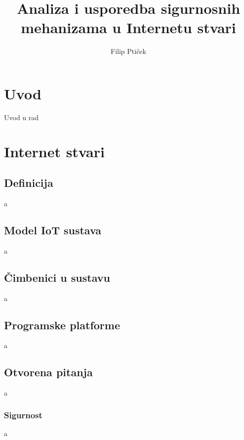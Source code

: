 \documentclass[times, utf8, diplomski]{fer}
\begin{document}

\title{Analiza i usporedba sigurnosnih mehanizama u Internetu stvari}

\author{Filip Ptiček}

\maketitle



\zahvala{}

\tableofcontents

\chapter{Uvod}
Uvod u rad

\chapter{Internet stvari}

\section{Definicija}
a

\section{Model IoT sustava}
a

\section{Čimbenici u sustavu}
a

\section{Programske platforme}
a

\section{Otvorena pitanja}
a

\subsection{Sigurnost}
a
\end{document}
